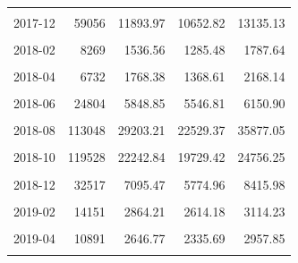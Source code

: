 \begin{longtable}[t]{crrrr}
\cellcolor{gray!10}{2017-11} & \cellcolor{gray!10}{93193} & \cellcolor{gray!10}{19173.06} & \cellcolor{gray!10}{17427.45} & \cellcolor{gray!10}{20918.67}\\
2017-12 & 59056 & 11893.97 & 10652.82 & 13135.13\\
\cellcolor{gray!10}{2018-01} & \cellcolor{gray!10}{14785} & \cellcolor{gray!10}{2913.49} & \cellcolor{gray!10}{2491.33} & \cellcolor{gray!10}{3335.66}\\
2018-02 & 8269 & 1536.56 & 1285.48 & 1787.64\\
\cellcolor{gray!10}{2018-03} & \cellcolor{gray!10}{9943} & \cellcolor{gray!10}{2434.78} & \cellcolor{gray!10}{2106.78} & \cellcolor{gray!10}{2762.77}\\
2018-04 & 6732 & 1768.38 & 1368.61 & 2168.14\\
\cellcolor{gray!10}{2018-05} & \cellcolor{gray!10}{14355} & \cellcolor{gray!10}{3522.69} & \cellcolor{gray!10}{3213.19} & \cellcolor{gray!10}{3832.20}\\
2018-06 & 24804 & 5848.85 & 5546.81 & 6150.90\\
\cellcolor{gray!10}{2018-07} & \cellcolor{gray!10}{55804} & \cellcolor{gray!10}{14019.80} & \cellcolor{gray!10}{11843.31} & \cellcolor{gray!10}{16196.30}\\
2018-08 & 113048 & 29203.21 & 22529.37 & 35877.05\\
\cellcolor{gray!10}{2018-09} & \cellcolor{gray!10}{210659} & \cellcolor{gray!10}{41117.54} & \cellcolor{gray!10}{37322.20} & \cellcolor{gray!10}{44912.87}\\
2018-10 & 119528 & 22242.84 & 19729.42 & 24756.25\\
\cellcolor{gray!10}{2018-11} & \cellcolor{gray!10}{61813} & \cellcolor{gray!10}{14558.41} & \cellcolor{gray!10}{12094.02} & \cellcolor{gray!10}{17022.80}\\
2018-12 & 32517 & 7095.47 & 5774.96 & 8415.98\\
\cellcolor{gray!10}{2019-01} & \cellcolor{gray!10}{22027} & \cellcolor{gray!10}{3903.79} & \cellcolor{gray!10}{3413.13} & \cellcolor{gray!10}{4394.44}\\
2019-02 & 14151 & 2864.21 & 2614.18 & 3114.23\\
\cellcolor{gray!10}{2019-03} & \cellcolor{gray!10}{22528} & \cellcolor{gray!10}{5540.29} & \cellcolor{gray!10}{4715.05} & \cellcolor{gray!10}{6365.53}\\
2019-04 & 10891 & 2646.77 & 2335.69 & 2957.85\\
\cellcolor{gray!10}{2019-05} & \cellcolor{gray!10}{12337} & \cellcolor{gray!10}{2993.32} & \cellcolor{gray!10}{2624.45} & \cellcolor{gray!10}{3362.18}\\

\end{longtable}
